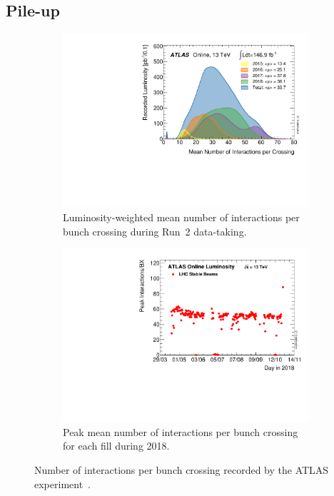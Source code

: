 \subsection{Pile-up}\label{sec:pileup}

\begin{figure}
	\centering
	\begin{subfigure}[b]{0.45\linewidth}
		\centering\includegraphics[width=\textwidth]{mu_2015_2018}
		\caption{Luminosity-weighted mean number of interactions per bunch crossing during Run~2 data-taking.\label{fig:mu_2015_2018}}
	\end{subfigure}\hfill
	\begin{subfigure}[b]{0.45\linewidth}
		\centering\includegraphics[width=\textwidth]{peakMuByFill}
		\caption{Peak mean number of interactions per bunch crossing for each fill during 2018.\label{fig:peakMuByFill}}
	\end{subfigure}%
	\caption{Number of interactions per bunch crossing recorded by the ATLAS experiment~\cite{ATLAS:Run2}.}\label{fig:mu_run2}
\end{figure}

